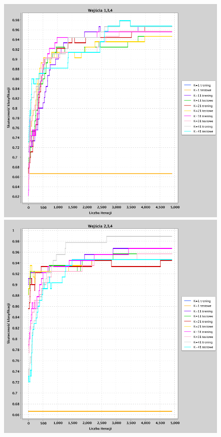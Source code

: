 \documentclass[a4paper, portrait,11pt]{article}
\begin{document}
\begin{figure}[!htb]
  \begin{minipage}{0.33\textwidth}
    \centering
    \includegraphics[width=1\linewidth]{../data/classification4/1/3_1,3,4.png}
    \caption{\label{fig:41_3_1,3,4}}
  \end{minipage}
  \begin{minipage}{0.33\textwidth}
    \centering
    \includegraphics[width=1\linewidth]{../data/classification4/1/3_2,3,4.png}

\end{minipage}
\end{figure}
\end{document}
